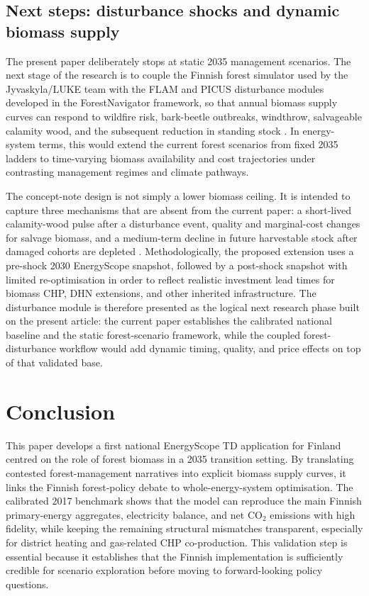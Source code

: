\documentclass{article}
\begin{document}
\subsection{Next steps: disturbance shocks and dynamic biomass supply}

The present paper deliberately stops at static 2035 management scenarios. The next stage of the research is to couple the Finnish forest simulator used by the Jyvaskyla/LUKE team with the FLAM and PICUS disturbance modules developed in the ForestNavigator framework, so that annual biomass supply curves can respond to wildfire risk, bark-beetle outbreaks, windthrow, salvageable calamity wood, and the subsequent reduction in standing stock \citep{venalainenClimateChangeInduces2020,hlasnyDevastatingOutbreakBark2021,tothImpactsCalamityLogging2020}. In energy-system terms, this would extend the current forest scenarios from fixed 2035 ladders to time-varying biomass availability and cost trajectories under contrasting management regimes and climate pathways.

The concept-note design is not simply a lower biomass ceiling. It is intended to capture three mechanisms that are absent from the current paper: a short-lived calamity-wood pulse after a disturbance event, quality and marginal-cost changes for salvage biomass, and a medium-term decline in future harvestable stock after damaged cohorts are depleted \citep{tothImpactsCalamityLogging2020,reckaRoleBiomassDecarbonisation2023}. Methodologically, the proposed extension uses a pre-shock 2030 EnergyScope snapshot, followed by a post-shock snapshot with limited re-optimisation in order to reflect realistic investment lead times for biomass CHP, DHN extensions, and other inherited infrastructure. The disturbance module is therefore presented as the logical next research phase built on the present article: the current paper establishes the calibrated national baseline and the static forest-scenario framework, while the coupled forest-disturbance workflow would add dynamic timing, quality, and price effects on top of that validated base.

\section{Conclusion}
\label{sec:conclusion}

This paper develops a first national EnergyScope TD application for Finland centred on the role of forest biomass in a 2035 transition setting. By translating contested forest-management narratives into explicit biomass supply curves, it links the Finnish forest-policy debate to whole-energy-system optimisation. The calibrated 2017 benchmark shows that the model can reproduce the main Finnish primary-energy aggregates, electricity balance, and net CO$_2$ emissions with high fidelity, while keeping the remaining structural mismatches transparent, especially for district heating and gas-related CHP co-production. This validation step is essential because it establishes that the Finnish implementation is sufficiently credible for scenario exploration before moving to forward-looking policy questions.
\end{document}

